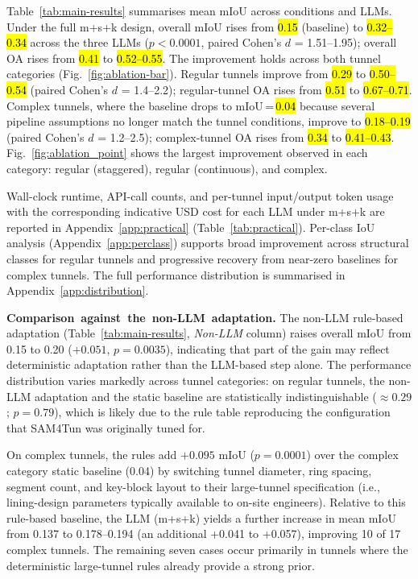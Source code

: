 \documentclass[a4paper,fleqn]{cas-dc}
\begin{document}
Table~\ref{tab:main-results} summarises mean mIoU across conditions and LLMs. Under the full m+s+k design, overall mIoU rises from \hl{0.15} (baseline) to \hl{0.32--0.34} across the three LLMs ($p < 0.0001$, paired Cohen's \mbox{$d$} = 1.51--1.95); overall OA rises from \hl{0.41} to \hl{0.52--0.55}. The improvement holds across both tunnel categories (Fig.~\ref{fig:ablation-bar}). Regular tunnels improve from \hl{0.29} to \hl{0.50--0.54} (paired Cohen's \mbox{$d$} = 1.4--2.2); regular-tunnel OA rises from \hl{0.51} to \hl{0.67--0.71}. Complex tunnels, where the baseline drops to mIoU\,=\,\hl{0.04} because several pipeline assumptions no longer match the tunnel conditions, improve to \hl{0.18--0.19} (paired Cohen's \mbox{$d$} = 1.2--2.5); complex-tunnel OA rises from \hl{0.34} to \hl{0.41--0.43}. Fig.~\ref{fig:ablation_point} shows the largest improvement observed in each category: regular (staggered), regular (continuous), and complex.

Wall-clock runtime, API-call counts, and per-tunnel input/output token usage with the corresponding indicative USD cost for each LLM under m+s+k are reported in Appendix~\ref{app:practical} (Table~\ref{tab:practical}). Per-class IoU analysis (Appendix~\ref{app:perclass}) supports broad improvement across structural classes for regular tunnels and progressive recovery from near-zero baselines for complex tunnels. The full performance distribution is summarised in Appendix~\ref{app:distribution}. 



\mbox{\textbf{Comparison against the non-LLM adaptation.}} The non-LLM rule-based adaptation (Table~\mbox{\ref{tab:main-results}}, \mbox{\emph{Non-LLM}} column) raises overall mIoU from 0.15 to 0.20 ($+0.051$, $p = 0.0035$), indicating that part of the gain may reflect deterministic adaptation rather than the LLM-based step alone. The performance distribution varies markedly across tunnel categories: on regular tunnels, the non-LLM adaptation and the static baseline are statistically indistinguishable ($\approx 0.29$; $p = 0.79$), which is likely due to the rule table reproducing the configuration that SAM4Tun was originally tuned for.

On complex tunnels, the rules add $+0.095$ mIoU ($p = 0.0001$) over the complex category static baseline (0.04) by switching tunnel diameter, ring spacing, segment count, and key-block layout to their large-tunnel specification (i.e., lining-design parameters typically available to on-site engineers). Relative to this rule-based baseline, the LLM (m+s+k) yields a further increase in mean mIoU from 0.137 to 0.178--0.194 (an additional +0.041 to +0.057), improving 10 of 17 complex tunnels. The remaining seven cases occur primarily in tunnels where the deterministic large-tunnel rules already provide a strong prior.
\end{document}
